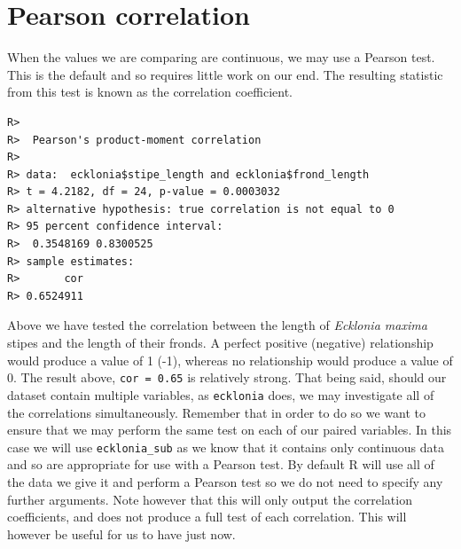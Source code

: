 \documentclass[english,10pt,a4paper,oneside]{book}
\newenvironment{Shaded}{\begin{snugshade}}{\end{snugshade}}
\newcommand{\CommentTok}[1]{\textcolor[rgb]{0.56,0.35,0.01}{\textit{#1}}}
\newcommand{\DataTypeTok}[1]{\textcolor[rgb]{0.13,0.29,0.53}{#1}}
\newcommand{\KeywordTok}[1]{\textcolor[rgb]{0.13,0.29,0.53}{\textbf{#1}}}
\newcommand{\NormalTok}[1]{#1}
\newcommand{\OperatorTok}[1]{\textcolor[rgb]{0.81,0.36,0.00}{\textbf{#1}}}
\newcommand{\StringTok}[1]{\textcolor[rgb]{0.31,0.60,0.02}{#1}}
\theoremstyle{definition}
\theoremstyle{definition}
\theoremstyle{definition}
\theoremstyle{remark}
\begin{document}
\hypertarget{pearson-correlation}{%
\section{Pearson correlation}\label{pearson-correlation}}

When the values we are comparing are continuous, we may use a Pearson
test. This is the default and so requires little work on our end. The
resulting statistic from this test is known as the correlation
coefficient.

\begin{Shaded}
\end{Shaded}

\begin{verbatim}
R> 
R>  Pearson's product-moment correlation
R> 
R> data:  ecklonia$stipe_length and ecklonia$frond_length
R> t = 4.2182, df = 24, p-value = 0.0003032
R> alternative hypothesis: true correlation is not equal to 0
R> 95 percent confidence interval:
R>  0.3548169 0.8300525
R> sample estimates:
R>       cor 
R> 0.6524911
\end{verbatim}

Above we have tested the correlation between the length of
\emph{Ecklonia maxima} stipes and the length of their fronds. A perfect
positive (negative) relationship would produce a value of 1 (-1),
whereas no relationship would produce a value of 0. The result above,
\texttt{cor\ =\ 0.65} is relatively strong. That being said, should our
dataset contain multiple variables, as \texttt{ecklonia} does, we may
investigate all of the correlations simultaneously. Remember that in
order to do so we want to ensure that we may perform the same test on
each of our paired variables. In this case we will use
\texttt{ecklonia\_sub} as we know that it contains only continuous data
and so are appropriate for use with a Pearson test. By default R will
use all of the data we give it and perform a Pearson test so we do not
need to specify any further arguments. Note however that this will only
output the correlation coefficients, and does not produce a full test of
each correlation. This will however be useful for us to have just now.
\end{document}
